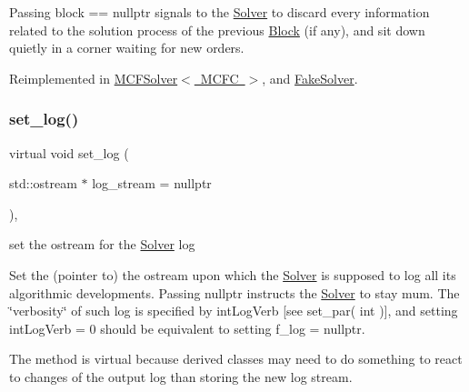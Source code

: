 Passing block == nullptr signals to the \mbox{\hyperlink{class_s_m_spp__di__unipi__it_1_1_solver}{Solver}} to discard every information related to the solution process of the previous \mbox{\hyperlink{class_s_m_spp__di__unipi__it_1_1_block}{Block}} (if any), and sit down quietly in a corner waiting for new orders. 

Reimplemented in \mbox{\hyperlink{class_s_m_spp__di__unipi__it_1_1_m_c_f_solver_a8d7fb698416759f38941e06b23cccaec}{M\+C\+F\+Solver$<$ M\+C\+F\+C $>$}}, and \mbox{\hyperlink{class_s_m_spp__di__unipi__it_1_1_fake_solver_a8d7fb698416759f38941e06b23cccaec}{Fake\+Solver}}.

\mbox{\label{class_s_m_spp__di__unipi__it_1_1_solver_aba02e3287c6c72bbacb555295168d0e8}} 
\subsubsection{\texorpdfstring{set\+\_\+log()}{set\_log()}}
{\footnotesize\ttfamily virtual void set\+\_\+log (\begin{DoxyParamCaption}\item[{std\+::ostream $\ast$}]{log\+\_\+stream = {\ttfamily nullptr} }\end{DoxyParamCaption})\hspace{0.3cm}{\ttfamily [inline]}, {\ttfamily [virtual]}}



set the ostream for the \mbox{\hyperlink{class_s_m_spp__di__unipi__it_1_1_solver}{Solver}} log 

Set the (pointer to) the ostream upon which the \mbox{\hyperlink{class_s_m_spp__di__unipi__it_1_1_solver}{Solver}} is supposed to log all its algorithmic developments. Passing nullptr instructs the \mbox{\hyperlink{class_s_m_spp__di__unipi__it_1_1_solver}{Solver}} to stay mum. The \char`\"{}verbosity\char`\"{} of such log is specified by int\+Log\+Verb \mbox{[}see set\+\_\+par( int )\mbox{]}, and setting int\+Log\+Verb = 0 should be equivalent to setting f\+\_\+log = nullptr.

The method is virtual because derived classes may need to do something to react to changes of the output log than storing the new log stream. \mbox{\label{class_s_m_spp__di__unipi__it_1_1_solver_ae1717d1363782e086aa797e7437c0352}} 
